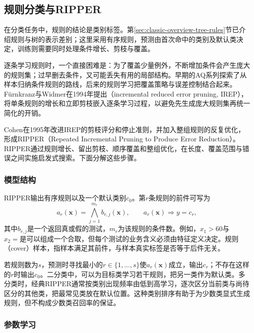 \subsection{规则分类与RIPPER}
\label{sec:classification-rules}
\label{sec:classification-ripper}

在分类任务中，规则的结论是类别标签。第\ref{sec:classic-overview-tree-rules}节已介绍规则与树的表示差别；这里采用有序规则，预测由首次命中的类别及默认类决定，训练则需要同时处理条件增长、剪枝与覆盖。

逐条学习规则时，一个直接困难是：为了覆盖少量例外，不断增加条件会产生庞大的规则集；过早删去条件，又可能丢失有用的局部结构。早期的AQ系列探索了从样本归纳条件规则的路线，后来的规则学习把覆盖策略与误差控制结合起来。Fürnkranz与Widmer在1994年提出（incremental reduced error pruning, IREP），将单条规则的增长和立即剪枝嵌入逐条学习过程，以避免先生成庞大规则集再统一简化的开销。

Cohen在1995年改进IREP的剪枝评分和停止准则，并加入整组规则的反复优化，形成RIPPER（Repeated Incremental Pruning to Produce Error Reduction）。RIPPER通过规则增长、留出剪枝、顺序覆盖和整组优化，在长度、覆盖范围与错误之间实施启发式搜索。下面分解这些步骤。

\subsubsection{模型结构}
\label{sec:classification-ripper-structure}

RIPPER输出有序规则以及一个默认类别$c_0$。第$r$条规则的前件可写为
\begin{equation}
  a_r(\bm{x})=\bigwedge_{j=1}^{m_r}b_{r,j}(\bm{x}),
  \qquad a_r(\bm{x})\Longrightarrow y=c_r,
  \label{eq:classification-rule-form}
\end{equation}
其中$b_{r,j}$是一个返回真或假的测试，$m_r$为该规则的条件数。例如，$x_1>60$与$x_2=\text{是}$可以组成一个合取，但每个测试的业务含义必须由特征定义决定。规则（cover）样本，指样本满足其前件，与样本真实标签是否等于后件无关。

若规则数为$s$，预测时寻找最小的$r\in\{1,\ldots,s\}$使$a_r(\bm{x})$成立，输出$c_r$；不存在这样的$r$时输出$c_0$。二分类中，可以为目标类学习若干规则，把另一类作为默认类。多分类时，经典RIPPER通常按类别出现频率由低到高学习，逐次区分当前类与尚待区分的其他类，把最常见类放在默认位置。这种类别排序有助于为少数类显式生成规则，但不构成少数类召回率的保证。

\subsubsection{参数学习}
\label{sec:classification-ripper-learning}

